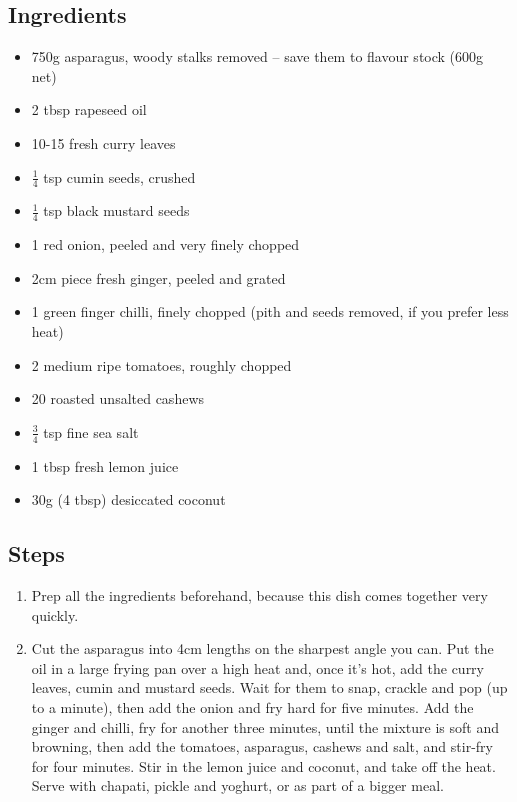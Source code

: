 \documentclass{book}
\begin{document}
\subsection*{Ingredients}
\begin{itemize}
\item 750g asparagus, woody stalks removed – save them to flavour stock (600g net)
\item 2 tbsp rapeseed oil
\item 10-15 fresh curry leaves
\item $\frac{1}{4}$ tsp cumin seeds, crushed
\item $\frac{1}{4}$ tsp black mustard seeds
\item 1 red onion, peeled and very finely chopped
\item 2cm piece fresh ginger, peeled and grated
\item 1 green finger chilli, finely chopped (pith and seeds removed, if you prefer less heat)
\item 2 medium ripe tomatoes, roughly chopped
\item 20 roasted unsalted cashews
\item $\frac{3}{4}$ tsp fine sea salt
\item 1 tbsp fresh lemon juice
\item 30g (4 tbsp) desiccated coconut
\end{itemize}

\subsection*{Steps}
\begin{enumerate}
\item Prep all the ingredients beforehand, because this dish comes together very quickly.
\item Cut the asparagus into 4cm lengths on the sharpest angle you can. Put the oil in a large frying pan over a high heat and, once it’s hot, add the curry leaves, cumin and mustard seeds. Wait for them to snap, crackle and pop (up to a minute), then add the onion and fry hard for five minutes. Add the ginger and chilli, fry for another three minutes, until the mixture is soft and browning, then add the tomatoes, asparagus, cashews and salt, and stir-fry for four minutes. Stir in the lemon juice and coconut, and take off the heat. Serve with chapati, pickle and yoghurt, or as part of a bigger meal.
\end{enumerate}
\newpage
\end{document}

